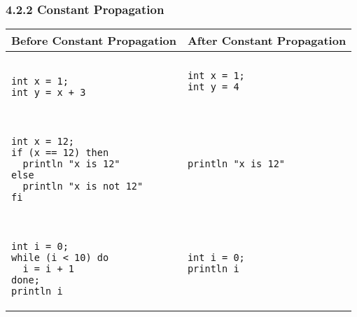 \documentclass[10pt,a4paper]{report}
\newenvironment{tabularverbatim}
 {\VerbatimEnvironment
  \begin{BVerbatim}[baseline=c,formatcom=\setlength{\baselineskip}{\normalbaselineskip}]}
 {\end{BVerbatim}}
\begin{document}
  \subsubsection*{4.2.2 Constant Propagation}
  \begin{center}
    \begin{tabular}{| m{5cm} | m{5cm} |}
      \hline
      Before Constant Propagation & After Constant Propagation \\
      \hline
      \begin{tabularverbatim}

int x = 1;
int y = x + 3

      \end{tabularverbatim}
       &
      \begin{tabularverbatim}
int x = 1; 
int y = 4
      \end{tabularverbatim}
      \\
      \hline
      \begin{tabularverbatim}
      
int x = 12;
if (x == 12) then
  println "x is 12"
else
  println "x is not 12"
fi

      \end{tabularverbatim}
      &
      \begin{tabularverbatim}
println "x is 12"
      \end{tabularverbatim}
      \\
      \hline
      \begin{tabularverbatim}

int i = 0;
while (i < 10) do
  i = i + 1
done;
println i

      \end{tabularverbatim}
      &
      \begin{tabularverbatim}
int i = 0;
println i
      \end{tabularverbatim}
      \\
      \hline
    \end{tabular}
  \end{center}
\end{document}
